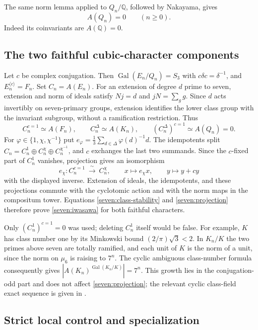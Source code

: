 \documentclass[11pt]{article}
\begin{document}
The same norm lemma applied to $Q_n/\mathbb Q$, followed by Nakayama,
gives
\[
 A(Q_n)=0 \qquad(n\ge0).
 \tag{S31}\label{seven:rational-layer}
\]
Indeed its coinvariants are $A(\mathbb Q)=0$.

\subsection{The two faithful cubic-character components}
\label{seven:character-components}

Let $c$ be complex conjugation. Then
$\operatorname{Gal}(E_n/Q_n)=S_3$ with
$c\delta c=\delta^{-1}$, and $E_n^{\langle c\rangle}=F_n$.
Set $C_n=A(E_n)$.
For an extension of degree $d$ prime to seven, extension and norm of ideals
satisfy
$Nj=d$ and $jN=\sum_g g$.
Since $d$ acts invertibly on seven-primary groups, extension identifies the
lower class group with the invariant subgroup, without a ramification
restriction. Thus
\[
 C_n^{c=1}\simeq A(F_n),\qquad
 C_n^\Delta\simeq A(K_n),\qquad
 (C_n^\Delta)^{c=1}\simeq A(Q_n)=0.
 \tag{S32}\label{seven:prime-to-seven-descent}
\]
For $\varphi\in\{1,\chi,\chi^{-1}\}$ put
$e_\varphi=\frac13\sum_{d\in\Delta}\varphi(d)^{-1}d$.
The idempotents split
$C_n=C_n^1\oplus C_n^\chi\oplus C_n^{\chi^{-1}}$, and $c$ exchanges the
last two summands.
Since the $c$-fixed part of $C_n^1$ vanishes, projection gives an
isomorphism
\[
 e_\chi:C_n^{c=1}\ \xrightarrow{\ \sim\ }\ C_n^\chi,
 \qquad x\longmapsto e_\chi x,
 \qquad y\longmapsto y+cy
 \tag{S33}\label{seven:projection}
\]
with the displayed inverse.
Extension of ideals, the idempotents, and these projections commute with
the cyclotomic action and with the norm maps in the compositum tower.
Equations \eqref{seven:class-stability} and \eqref{seven:projection}
therefore prove \eqref{seven:iwasawa} for both faithful characters.

Only $(C_n^1)^{c=1}=0$ was used; deleting $C_n^1$ itself would be false.
For example, $K$ has class number one by its Minkowski bound
$(2/\pi)\sqrt3<2$. In $K_n/K$ the two primes above seven are totally
ramified, and each unit of $K$ is the norm of a unit, since the norm on
$\mu_6$ is raising to $7^n$.
The cyclic ambiguous class-number formula consequently gives
$|A(K_n)^{\operatorname{Gal}(K_n/K)}|=7^n$.
This growth lies in the conjugation-odd part and does not affect
\eqref{seven:projection}; the relevant cyclic class-field exact sequence
is given in \cite[Theorem~1.3.16]{sevenSharifi}.

\subsection{Strict local control and specialization}
\label{seven:control}
\end{document}
